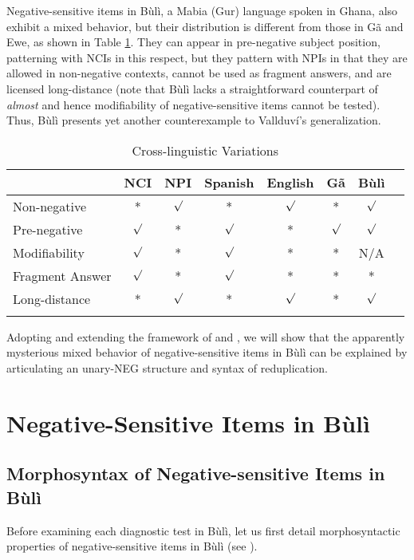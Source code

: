 \documentclass[output=paper,colorlinks,citecolor=brown]{langscibook}
\begin{document}
Negative-sensitive items in Bùlì, a Mabia (Gur) language spoken in Ghana, also exhibit a mixed behavior, but their distribution is different from those in G\~a and Ewe, as shown in Table \ref{nci-npi2}. They can appear in pre-negative subject position, patterning with NCIs in this respect, but they pattern with NPIs in that they are allowed in non-negative contexts, cannot be used as fragment answers, and are licensed long-distance (note that Bùlì lacks a straightforward counterpart of \textit{almost} and hence  modifiability of negative-sensitive items cannot be tested).  Thus, Bùlì presents yet another counterexample to Vallduví's generalization.


\begin{table}
  \begin{tabularx}{\textwidth}{lccccccl}
\lspbottomrule
 & NCI & NPI  &  Spanish &  English  & G\~a &  Bùlì    \\
   \midrule
 Non-negative & *  & $\surd$ & * &  $\surd$ &   *  & $\surd$  \\
Pre-negative &  $\surd$ & * & $\surd$ &   * &  $\surd$ &   $\surd$ \\
Modifiability & $\surd$  & *  & $\surd$ & *    &   * &  N/A \\
Fragment Answer & $\surd$ & *  & $\surd$ & * &  * &  *  \\
Long-distance & *  & $\surd$  & * & $\surd$   &  * & $\surd$  \\
\lspbottomrule
  \end{tabularx}
  \caption{Cross-linguistic Variations} \label{nci-npi2}
\end{table}


Adopting and extending the framework of \cite{CollinsPostal2014} and \cite{CollinsEtAl2017},  we will show that the apparently mysterious mixed behavior of negative-sensitive items in Bùlì can be explained by articulating an unary-NEG structure and  syntax of reduplication.


\section{Negative-Sensitive Items in Bùlì}

\subsection{Morphosyntax of Negative-sensitive Items in Bùlì}

Before examining each diagnostic test in Bùlì, let us first detail morphosyntactic properties of negative-sensitive items in Bùlì (see \citealt{Akanlig-Pare2005, Akanlig-Pare2014}).
\end{document}
